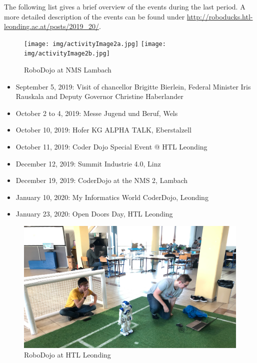 \documentclass[11pt]{article}
\begin{document}
The following list gives a brief overview of the events during the last period. A more detailed description of the events can be found under \url{http://roboducks.htl-leonding.ac.at/posts/2019_20/}.

\begin{figure}
\begin{center}
\texttt{[image: img/activityImage2a.jpg]}
\texttt{[image: img/activityImage2b.jpg]}
\end{center}
\caption{RoboDojo at NMS Lambach}
\label{fig:rcjWinners}
\end{figure}

\begin{itemize}
	\item September 5, 2019: Visit of chancellor Brigitte Bierlein, Federal Minister Iris Rauskala and Deputy Governor Christine Haberlander
	\item October 2 to 4, 2019: Messe Jugend und Beruf, Wels
	\item  October 10, 2019: Hofer KG ALPHA TALK, Eberstalzell
	\item  October 11, 2019: Coder Dojo Special Event @ HTL Leonding
	\item  December 12, 2019: Summit Industrie 4.0, Linz
	\item  December 19, 2019: CoderDojo at the NMS 2, Lambach
	\item  January 10, 2020: My Informatics World CoderDojo, Leonding
	\item  January 23, 2020: Open Doors Day, HTL Leonding
\end{itemize}

\begin{figure}
\begin{center}
\includegraphics[scale=0.25]{img/activityImage3.png}
\end{center}
\caption{RoboDojo at HTL Leonding}
\label{fig:soccerTraining}
\end{figure}
\end{document}
